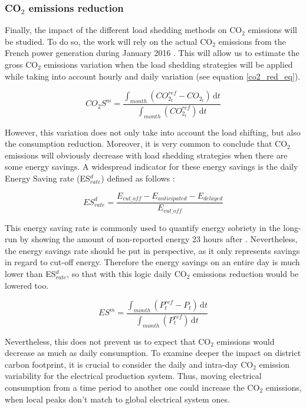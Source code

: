 \documentclass[buildings,article,submit,moreauthors,pdftex,10pt,a4paper]{mdpi}
\theoremstyle{mdpi}
\newcounter{ex}
\newcounter{re}
\theoremstyle{mdpidefinition}
\begin{document}
\subsubsection{CO$_{2}$ emissions reduction}
Finally, the impact of the different load shedding methods on CO$_{2}$ emissions will be studied. To do so, the work will rely on the actual CO$_{2}$ emissions from the French power generation during January 2016 \cite{noauthor_eco2mix_2014}. 
This will allow us to estimate the gross CO$_{2}$ emissions variation when the load shedding strategies will be applied while taking into account hourly and daily variation (see equation \ref{co2_red_eq}). 

\begin{equation}
\label{co2_red_eq}
    CO_{2}S^{m} = \frac{\int_{month}(CO_{{2}_{t}}^{ref} - CO_{{2}_{t}})\, \mathrm{d}t}
    {\int_{month}(CO_{{2}_{t}}^{ref})\, \mathrm{d}t }
\end{equation}

However, this variation does not only take into account the load shifting, but also the consumption reduction. Moreover, it is very common to conclude that CO$_2$ emissions will obviously decrease with load shedding strategies when there are some energy savings. A widespread indicator for these energy savings is the daily Energy Saving rate (ES$_{rate}^{d}$) defined as follows :

\begin{equation}
    ES_{rate}^{d} = \frac{E_{cut\_off} - E_{anticipated} - E_{delayed}}{E_{cut\_off}}
\end{equation}

This energy saving rate is commonly used to quantify energy sobriety in the long-run by showing the amount of non-reported energy 23 hours after \cite{RTE_rapport_report}. Nevertheless, the energy savings rate should be put in perspective, as it only represents savings in regard to cut-off energy. Therefore the energy savings on an entire day is much lower than ES$_{rate}^{d}$, so that with this logic daily CO$_2$ emissions reduction would be lowered too.

\begin{equation}
\label{ES_month}
    ES^{m} = \frac{\int_{month}(P_{t}^{ref} - P_{t})\, \mathrm{d}t}{\int_{month}(P_{t}^{ref})\, \mathrm{d}t}
\end{equation}

Nevertheless, this does not prevent us to expect that CO$_2$ emissions would decrease as much as daily consumption. To examine deeper the impact on district carbon footprint, it is crucial to consider the daily and intra-day CO$_2$ emission variability for the electrical production system. Thus, moving electrical consumption from a time period to another one could increase the CO$_2$ emissions, when local peaks don't match to global electrical system ones.
\end{document}
